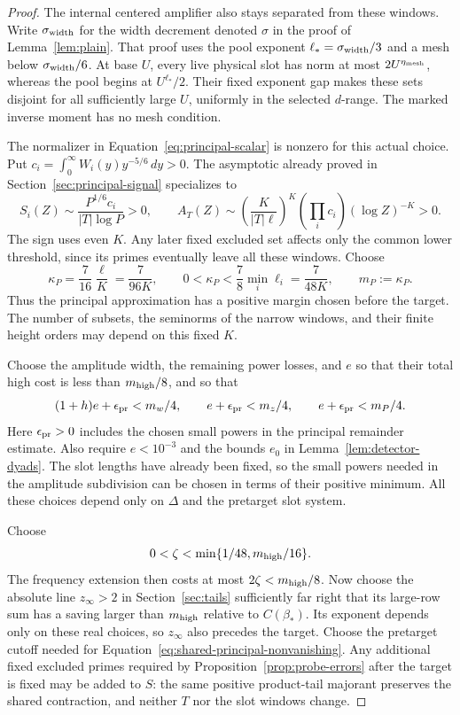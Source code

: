 \documentclass[11pt,a4paper]{article}
\numberwithin{equation}{section}
\numberwithin{figure}{section}
\theoremstyle{definition}
\theoremstyle{remark}
\begin{document}
\begin{proof}
The internal centered amplifier also stays separated from these windows.
Write \(\sigma_{\rm width}\) for the width decrement denoted \(\sigma\)
in the proof of Lemma~\ref{lem:plain}.  That proof uses the pool exponent
\(\ell_*=\sigma_{\rm width}/3\) and a mesh below
\(\sigma_{\rm width}/6\).  At base \(U\), every live physical slot has
norm at most \(2U^{\eta_{\rm mesh}}\), whereas the pool begins at
\(U^{\ell_*}/2\).  Their fixed exponent gap makes these sets disjoint
for all sufficiently large \(U\), uniformly in the selected \(d\)-range.
The marked inverse moment has no mesh condition.

The normalizer in Equation~\eqref{eq:principal-scalar} is nonzero for
this actual choice.  Put
\(c_i=\int_0^\infty W_i(y)y^{-5/6}\,dy>0\).  The asymptotic already
proved in Section~\ref{sec:principal-signal} specializes to
\[
 S_i(Z)\sim\frac{P^{1/6}c_i}{|T|\log P}>0,\qquad
 A_T(Z)\sim
 \left(\frac{K}{|T|\ell}\right)^K
       \left(\prod_i c_i\right)(\log Z)^{-K}>0.
\]
The sign uses even \(K\).  Any later fixed excluded set affects only
the common lower threshold, since its primes eventually leave all
these windows.  Choose
\[
 \kappa_P=\frac7{16}\frac{\ell}{K}=\frac7{96K},
 \qquad 0<\kappa_P<\frac78\min_i\ell_i=\frac7{48K},
 \qquad m_P:=\kappa_P.
\]
Thus the principal approximation has a positive margin chosen before
the target.  The number of subsets, the seminorms of the narrow windows,
and their finite height orders may depend on this fixed \(K\).

Choose the amplitude width, the remaining power losses, and \(e\) so
that their total high cost is less than \(m_{\rm high}/8\), and so that
\[
 (1+h)e+\epsilon_{\rm pr}<m_w/4,\qquad
 e+\epsilon_{\rm pr}<m_z/4,\qquad
 e+\epsilon_{\rm pr}<m_P/4.
\]
Here \(\epsilon_{\rm pr}>0\) includes the chosen small powers in the
principal remainder estimate.  Also require \(e<10^{-3}\) and the bounds
\(e_0\) in Lemma~\ref{lem:detector-dyads}.  The slot lengths have already
been fixed, so the small powers needed in the amplitude subdivision can
be chosen in terms of their positive minimum.  All these choices depend
only on \(\Delta\) and the pretarget slot system.

Choose
\[
 0<\zeta<\min\{1/48,m_{\rm high}/16\}.
\]
The frequency extension then costs at most
\(2\zeta<m_{\rm high}/8\).  Now choose the absolute line \(z_\infty>2\)
in Section~\ref{sec:tails} sufficiently far right that its large-row
sum has a saving larger than \(m_{\rm high}\) relative to \(C(\beta_*)\).
Its exponent depends only on
these real choices, so \(z_\infty\) also precedes the target.
Choose the pretarget cutoff needed for
Equation~\eqref{eq:shared-principal-nonvanishing}.  Any additional fixed
excluded primes required by Proposition~\ref{prop:probe-errors} after
the target is fixed may be added to \(S\): the same positive product-tail
majorant preserves the shared contraction, and neither \(T\) nor the
slot windows change.


\end{proof}
\end{document}
